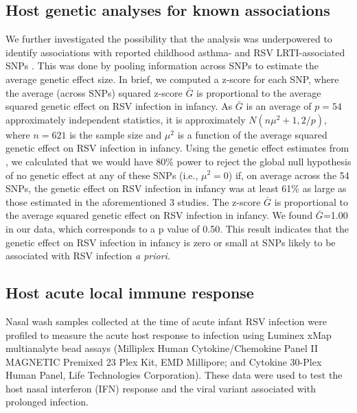 \documentclass{article} %
\begin{document}
\subsection{Host genetic analyses for known associations} 
\label{sec:Supplemental_hostgen}
We further investigated the possibility that the analysis was underpowered to identify associations with reported childhood asthma- and RSV LRTI-associated SNPs \citep{pividori2019shared, janssen2007genetic, pasanen2017genome}.
This was done by pooling information across SNPs to estimate the average genetic effect size. 
In brief, we computed a z-score for each SNP, where the average (across SNPs) squared z-score $\bar{G}$ is proportional to the average squared genetic effect on RSV infection in infancy. 
As $\bar{G}$ is an average of $p=54$ approximately independent statistics, it is approximately
$N(n\mu^2 + 1,2/p)$, where $n=621$  is the sample size and $\mu^2$ is a function of the average squared genetic effect on RSV infection in infancy. Using the genetic effect estimates from 
\citet{pividori2019shared, janssen2007genetic, pasanen2017genome}
, we calculated that we would have 80\% power
to reject the global null hypothesis of no genetic effect at any of
these SNPs (i.e., $\mu^2 =0$) if, on average across the 54 SNPs, the genetic effect on RSV infection
in infancy was at least 61\% as large as those estimated in the aforementioned 3 studies. 
The z-score $\bar{G}$ is proportional to the average squared genetic effect on RSV infection in infancy. 
We found $\bar{G}$=1.00  in our data, which corresponds to a p value of 0.50. 
This result indicates that the genetic effect on RSV infection in infancy is zero or small at SNPs likely to be associated with RSV infection \textit{a priori.}

\subsection{Host acute local immune response}
Nasal wash samples collected at the time of acute infant RSV infection were profiled to measure the acute host response to infection using Luminex xMap multianalyte bead assays (Milliplex Human Cytokine/Chemokine Panel II MAGNETIC Premixed 23 Plex Kit, EMD Millipore; and Cytokine 30-Plex Human Panel, Life Technologies Corporation). 
These data were used to test the host nasal interferon (IFN) response and the viral variant associated with prolonged infection.  
\end{document}
